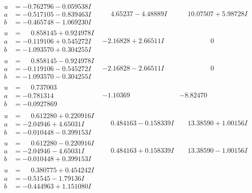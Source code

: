 \documentclass[1p]{elsarticle_modified}
\theoremstyle{definition}
\begin{document}
$$\begin{array}{c|c|c}
\begin{aligned}
u &= -0.762796 - 0.059538 I \\
a &= -0.517105 - 0.839463 I \\
b &= -0.465748 - 1.069230 I\end{aligned}
 & \phantom{-}4.65237 - 4.48889 I & \phantom{-}10.07507 + 5.98728 I \\ \hline\begin{aligned}
u &= \phantom{-}0.858145 + 0.924978 I \\
a &= -0.119106 + 0.545272 I \\
b &= -1.093570 + 0.304255 I\end{aligned}
 & -2.16828 + 2.66511 I & \phantom{-0.000000 } 0 \\ \hline\begin{aligned}
u &= \phantom{-}0.858145 - 0.924978 I \\
a &= -0.119106 - 0.545272 I \\
b &= -1.093570 - 0.304255 I\end{aligned}
 & -2.16828 - 2.66511 I & \phantom{-0.000000 } 0 \\ \hline\begin{aligned}
u &= \phantom{-}0.737003\phantom{ +0.000000I} \\
a &= -0.781314\phantom{ +0.000000I} \\
b &= -0.0927869\phantom{ +0.000000I}\end{aligned}
 & -1.10369\phantom{ +0.000000I} & -8.82470\phantom{ +0.000000I} \\ \hline\begin{aligned}
u &= \phantom{-}0.612280 + 0.220916 I \\
a &= -2.04946 + 4.65031 I \\
b &= -0.010448 - 0.399153 I\end{aligned}
 & \phantom{-}0.484163 - 0.158339 I & \phantom{-}13.38590 + 1.00156 I \\ \hline\begin{aligned}
u &= \phantom{-}0.612280 - 0.220916 I \\
a &= -2.04946 - 4.65031 I \\
b &= -0.010448 + 0.399153 I\end{aligned}
 & \phantom{-}0.484163 + 0.158339 I & \phantom{-}13.38590 - 1.00156 I \\ \hline\begin{aligned}
u &= \phantom{-}0.380775 + 0.454242 I \\
a &= -0.51545 - 1.79136 I \\
b &= -0.444963 + 1.151080 I\end{aligned}

\end{array}$$
\end{document}
